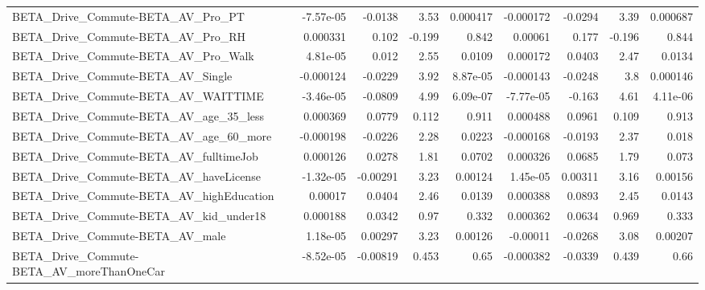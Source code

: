 \begin{tabular}{lrrrrrrrr}
BETA\_Drive\_Commute-BETA\_AV\_Pro\_PT                  &   -7.57e-05 &      -0.0138 &     3.53 & 0.000417 &  -0.000172 &     -0.0294 &         3.39 &      0.000687 \\
BETA\_Drive\_Commute-BETA\_AV\_Pro\_RH                  &    0.000331 &        0.102 &   -0.199 &    0.842 &    0.00061 &       0.177 &       -0.196 &         0.844 \\
BETA\_Drive\_Commute-BETA\_AV\_Pro\_Walk                &    4.81e-05 &        0.012 &     2.55 &   0.0109 &   0.000172 &      0.0403 &         2.47 &        0.0134 \\
BETA\_Drive\_Commute-BETA\_AV\_Single                  &   -0.000124 &      -0.0229 &     3.92 & 8.87e-05 &  -0.000143 &     -0.0248 &          3.8 &      0.000146 \\
BETA\_Drive\_Commute-BETA\_AV\_WAITTIME                &   -3.46e-05 &      -0.0809 &     4.99 & 6.09e-07 &  -7.77e-05 &      -0.163 &         4.61 &      4.11e-06 \\
BETA\_Drive\_Commute-BETA\_AV\_age\_35\_less             &    0.000369 &       0.0779 &    0.112 &    0.911 &   0.000488 &      0.0961 &        0.109 &         0.913 \\
BETA\_Drive\_Commute-BETA\_AV\_age\_60\_more             &   -0.000198 &      -0.0226 &     2.28 &   0.0223 &  -0.000168 &     -0.0193 &         2.37 &         0.018 \\
BETA\_Drive\_Commute-BETA\_AV\_fulltimeJob             &    0.000126 &       0.0278 &     1.81 &   0.0702 &   0.000326 &      0.0685 &         1.79 &         0.073 \\
BETA\_Drive\_Commute-BETA\_AV\_haveLicense             &   -1.32e-05 &     -0.00291 &     3.23 &  0.00124 &   1.45e-05 &     0.00311 &         3.16 &       0.00156 \\
BETA\_Drive\_Commute-BETA\_AV\_highEducation           &     0.00017 &       0.0404 &     2.46 &   0.0139 &   0.000388 &      0.0893 &         2.45 &        0.0143 \\
BETA\_Drive\_Commute-BETA\_AV\_kid\_under18             &    0.000188 &       0.0342 &     0.97 &    0.332 &   0.000362 &      0.0634 &        0.969 &         0.333 \\
BETA\_Drive\_Commute-BETA\_AV\_male                    &    1.18e-05 &      0.00297 &     3.23 &  0.00126 &   -0.00011 &     -0.0268 &         3.08 &       0.00207 \\
BETA\_Drive\_Commute-BETA\_AV\_moreThanOneCar          &   -8.52e-05 &     -0.00819 &    0.453 &     0.65 &  -0.000382 &     -0.0339 &        0.439 &          0.66 \\

\end{tabular}
